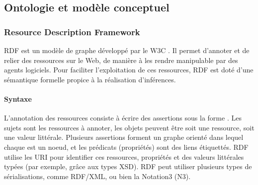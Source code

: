 \subsection{Ontologie et modèle conceptuel}\label{sec:onto-mc}\label{sec:ln-onto}
\subsubsection{Resource Description Framework}\label{sec:rdf}
RDF est un modèle de graphe développé par le W3C .
Il permet d'annoter et de relier des ressources sur le Web, de manière à les rendre manipulable par des agents logiciels.
Pour faciliter l'exploitation de ces ressources, RDF est doté d'une sémantique formelle propice à la réalisation d'inférences.




\paragraph{Syntaxe}
L'annotation des ressources consiste à écrire des assertions sous la forme .
Les sujets sont les ressources à annoter, les objets peuvent être soit une ressource, soit une valeur littérale.
Plusieurs assertions forment un graphe orienté dans lequel chaque  est un noeud, et les prédicats (propriétés) sont des liens étiquettés.
RDF utilise les URI pour identifier ces ressources, propriétés et des valeurs littérales typées (par exemple, grâce aux types XSD).
RDF peut utiliser plusieurs types de sérialisations, comme RDF/XML, ou bien la Notation3 (N3).

